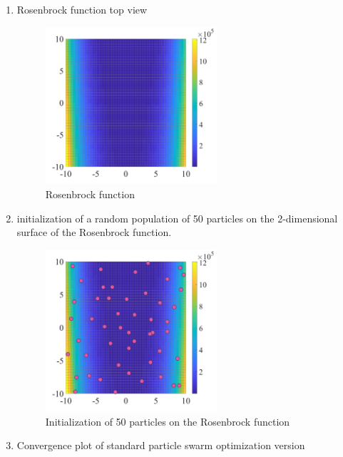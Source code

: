 \begin{enumerate}
    \item Rosenbrock function top view
    \begin{figure} [H]
    \centering
        \includegraphics[width=0.60\textwidth]{"Part 2 - Search-Based Optimization/Particle Swarm Optimization/Images/rosenbrock.PNG"}
        \caption{Rosenbrock function}
        \label{fig:rosenbrock_function}
    \end{figure}
    
    \item initialization of a random population of 50 particles on the 2-dimensional surface of the Rosenbrock function.
    \begin{figure} [H]
    \centering
        \includegraphics[width=0.60\textwidth]{"Part 2 - Search-Based Optimization/Particle Swarm Optimization/Images/rosenbrock_plot_particles.PNG"}
        \caption{Initialization of 50 particles on the Rosenbrock function}
        \label{fig:rosenbrock_function_inicializarion_particles}
    \end{figure}

    \item Convergence plot of standard particle swarm optimization version 
    

\end{enumerate}
